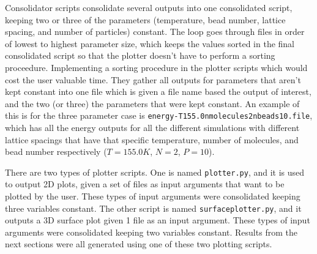 \documentclass[11pt]{article}
\makeatletter
\let\workreportsection\section
\renewcommand{\section}{\@ifstar{\workreportstarsection}{\workreportsection}}
\newcommand{\workreportstarsection}[1]{\workreportsection*{#1}\addcontentsline{toc}{section}{#1}}
\makeatother
\begin{document}
Consolidator scripts consolidate several outputs into one consolidated script, keeping two or three of the parameters (temperature, bead number, lattice spacing, and number of particles) constant. The loop goes through files in order of lowest to highest parameter size, which keeps the values sorted in the final consolidated script so that the plotter doesn't have to perform a sorting proceedure. Implementing a sorting procedure in the plotter scripts which would cost the user valuable time. They gather all outputs for parameters that aren't kept constant into one file which is given a file name based the output of interest, and the two (or three) the parameters that were kept constant. An example of this is for the three parameter case is \texttt{energy-T155.0nmolecules2nbeads10.file}, which has all the energy outputs for all the different simulations with different lattice spacings that have that specific temperature, number of molecules, and bead number respectively (\begin{math} T = 155.0 K \end{math}, \begin{math} N = 2 \end{math}, \begin{math} P = 10 \end{math}). 

There are two types of plotter scripts. One is named \texttt{plotter.py}, and it is used to output 2D plots, given a set of files as input arguments that want to be plotted by the user. These types of input arguments were consolidated keeping three variables constant. The other script is named \texttt{surfaceplotter.py}, and it outputs a 3D surface plot given 1 file as an input argument. These types of input arguments were consolidated keeping two variables constant. Results from the next sections were all generated using one of these two plotting scripts.

\vspace{1cm}

\section{Simulation Results and Discussion}
\end{document}
